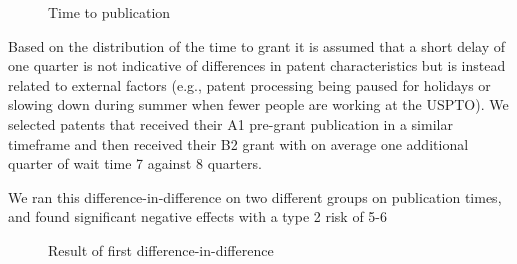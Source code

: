 \documentclass[12pt]{article}
\begin{document}
\begin{figure}[h]
\caption{Time to publication}
\centering
\end{figure}

Based on the distribution of the time to grant it is assumed that a short delay of one quarter is not indicative of differences in patent characteristics but is instead related to external factors (e.g., patent processing being paused for holidays or slowing down during summer when fewer people are working at the USPTO). We selected patents that received their A1 pre-grant publication in a similar timeframe and then received their B2 grant with on average one additional quarter of wait time 7 against 8 quarters. 

\begin{center}
\hspace*{1.5cm}
\end{center}
We ran this difference-in-difference on two different groups on publication times, and found significant negative effects with a type 2 risk of 5-6%
\begin{figure}[h]
\caption{Result of first difference-in-difference}
\centering
\end{figure}
\end{document}
